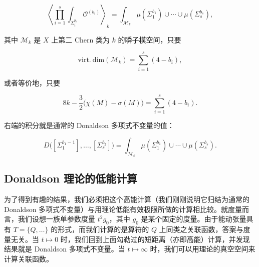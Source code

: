 \[
  \left\langle\prod_{i=1}^{s}\int_{\Sigma_i^{b_i}}\mathcal O^{(b_i)}\right\rangle_k
  =\int_{\mathcal M_k}\mu(\Sigma_1^{b_1})\cup\cdots\cup\mu(\Sigma_s^{b_s}),
\]

其中 $\mathcal M_k$ 是 $X$ 上第二 Chern 类为 $k$ 的瞬子模空间，只要

\[
  \mathrm{virt.\ dim}(\mathcal M_k)=\sum_{i=1}^{s}(4-b_i),
\]

或者等价地，只要

\[
  8k-\frac{3}{2}\bigl(\chi(M)-\sigma(M)\bigr)=\sum_{i=1}^{s}(4-b_i).
\]


右端的积分就是通常的 Donaldson 多项式不变量的值：

\[
  D\bigl([\Sigma_1^{b_1-1}],\ldots,[\Sigma_s^{b_2}]\bigr)
  =\int_{\mathcal M_k}\mu(\Sigma_1^{b_1})\cup\cdots\cup\mu(\Sigma_s^{b_s}).
\]



\subsection{Donaldson 理论的低能计算}

为了得到有趣的结果，我们必须把这个高能计算（我们刚刚说明它归结为通常的 Donaldson 多项式不变量）与用理论低能有效极限所做的计算相比较。就度量而言，我们设想一族单参数度量 $t^2g_0$，其中 $g_0$ 是某个固定的度量。由于能动张量具有 $T=\{Q,\ldots\}$ 的形式，而我们计算的是算符的 $Q$ 上同类之关联函数，答案与度量无关。当 $t\mapsto0$ 时，我们回到上面勾勒过的短距离（亦即高能）计算，并发现结果就是 Donaldson 多项式不变量。当 $t\mapsto\infty$ 时，我们可以用理论的真空空间来计算关联函数。

